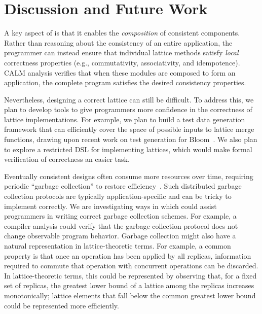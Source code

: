 \section{Discussion and Future Work}
\label{sec:discussion}
A key aspect of \lang is that it enables the \emph{composition} of consistent
components. Rather than reasoning about the consistency of an entire
application, the programmer can instead ensure that individual lattice methods
satisfy \emph{local} correctness properties (e.g., commutativity, associativity,
and idempotence). CALM analysis verifies that when these modules are composed to
form an application, the complete program satisfies the desired consistency
properties.

Nevertheless, designing a correct lattice can still be difficult. To address
this, we plan to develop tools to give programmers more confidence in the
correctness of lattice implementations. For example, we plan to build a test
data generation framework that can efficiently cover the space of possible
inputs to lattice merge functions, drawing upon recent work on test generation
for Bloom~\cite{Alvaro2012}. We also plan to explore a restricted DSL for
implementing lattices, which would make formal verification of correctness an
easier task.

Eventually consistent designs often consume more resources over time, requiring
periodic ``garbage collection'' to restore efficiency~\cite{Shapiro2011a}. Such
distributed garbage collection protocols are typically application-specific and
can be tricky to implement correctly. We are investigating ways in which \lang
could assist programmers in writing correct garbage collection schemes. For
example, a compiler analysis could verify that the garbage collection protocol
does not change observable program behavior. Garbage collection might also have
a natural representation in lattice-theoretic terms. For example, a common
property is that once an operation has been applied by all replicas, information
required to commute that operation with concurrent operations can be
discarded. In lattice-theoretic terms, this could be represented by observing
that, for a fixed set of replicas, the greatest lower bound of a lattice among
the replicas increases monotonically; lattice elements that fall below the
common greatest lower bound could be represented more efficiently.

